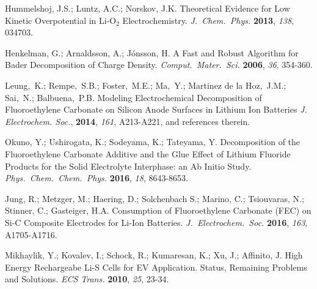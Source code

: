 \documentclass[prb,preprint,amsmath,amssymb]{revtex4}
\begin{document}
\begin{references}
Hummelshoj, J.S.; Luntz, A.C.; Norskov, J.K.
Theoretical Evidence for Low Kinetic Overpotential in Li-O$_2$ Electrochemistry.
{\it J.~Chem.~Phys.} {\bf 2013}, {\it 138}, 034703.

Henkelman, G.; Arnaldsson, A.; J\'{o}nsson, H.
A Fast and Robust Algorithm for Bader Decomposition of Charge Density.
{\it Comput.~Mater.~Sci.} {\bf 2006}, {\it 36}, 354-360.

Leung,~K.; Rempe,~S.B.; Foster,~M.E.; Ma,~Y.; Martinez de la Hoz,~J.M.;
Sai,~N.; Balbuena,~P.B.
Modeling Electrochemical Decomposition of Fluoroethylene Carbonate
on Silicon Anode Surfaces in Lithium Ion Batteries
{\it J. Electrochem. Soc.}, {\bf 2014}, {\it 161}, A213-A221,
and references therein.

Okuno, Y.; Ushirogata, K.; Sodeyama, K.; Tateyama, Y. 
Decomposition of the Fluoroethylene Carbonate Additive and the Glue Effect
of Lithium Fluoride Products for the Solid Electrolyte Interphase: an Ab
Initio Study.  {\it Phys.~Chem.~Chem.~Phys.} {\bf 2016}, {\it 18}, 8643-8653.

Jung, R.; Metzger, M.; Haering, D.; Solchenbach S.; Marino, C.;
Tsiouvaras, N.; Stinner, C.; Gasteiger, H.A.
Consumption of Fluoroethylene Carbonate (FEC) on Si-C
Composite Electrodes for Li-Ion Batteries.
{\it J.~Electrochem.~Soc.} {\bf 2016}, {\it 163}, A1705-A1716.

Mikhaylik, Y.; Kovalev, I.; Schock, R.; Kumaresan, K.; Xu, J.; Affinito, J.
High Energy Rechargeabe Li-S Cells for EV Application.  Status, Remaining
Problems and Solutions.  {\it ECS Trans.} {\bf 2010}, {\it 25}, 23-34.

\end{references}
\end{document}
